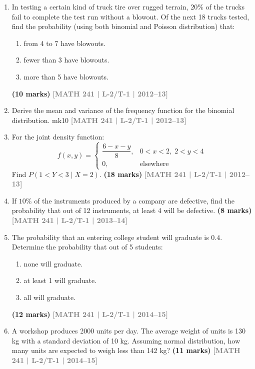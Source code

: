 \documentclass[12pt,a4paper]{article}
\newcommand{\yr}[1]{\hfill\textcolor{gray}{\small\textbf{[#1]}}}
\newcommand{\mk}[1]{\textcolor{orange!70!black}{\small\textbf{(#1 marks)}}}
\begin{document}
\begin{enumerate}
\item In testing a certain kind of truck tire over rugged terrain, $20\%$ of the trucks fail to complete the test run without a blowout. Of the next 18 trucks tested, find the probability (using both binomial and Poisson distribution) that:
\begin{enumerate}
  \item from 4 to 7 have blowouts.
  \item fewer than 3 have blowouts.
  \item more than 5 have blowouts.
\end{enumerate}
\mk{10} \yr{MATH 241 | L-2/T-1 | 2012--13}

\item Derive the mean and variance of the frequency function for the binomial distribution.
mk{10} \yr{MATH 241 | L-2/T-1 | 2012--13}

\item For the joint density function:
\[
f(x,y) = \begin{cases} \dfrac{6-x-y}{8}, & 0<x<2,\; 2<y<4 \\ 0, & \text{elsewhere} \end{cases}
\]
Find $P(1<Y<3\mid X=2)$.
\mk{18} \yr{MATH 241 | L-2/T-1 | 2012--13}

\item If $10\%$ of the instruments produced by a company are defective, find the probability that out of 12 instruments, at least 4 will be defective.
\mk{8} \yr{MATH 241 | L-2/T-1 | 2013--14}

\item The probability that an entering college student will graduate is $0.4$. Determine the probability that out of 5 students:
\begin{enumerate}
  \item none will graduate.
  \item at least 1 will graduate.
  \item all will graduate.
\end{enumerate}
\mk{12} \yr{MATH 241 | L-2/T-1 | 2014--15}

\item A workshop produces 2000 units per day. The average weight of units is 130 kg with a standard deviation of 10 kg. Assuming normal distribution, how many units are expected to weigh less than 142 kg?
\mk{11} \yr{MATH 241 | L-2/T-1 | 2014--15}

\begin{center}
\end{center}
\end{enumerate}
\end{document}
